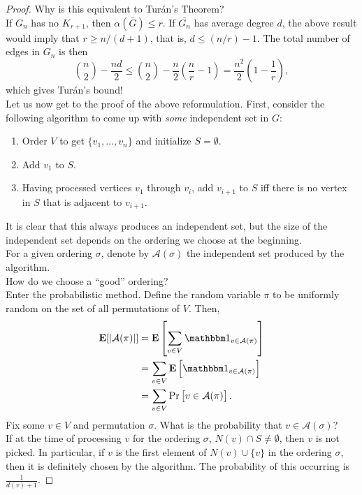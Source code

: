 \documentclass{article}
\begin{document}
		\begin{proof}
			Why is this equivalent to Tur\'{a}n's Theorem?\\
			If $G_n$ has no $K_{r+1}$, then $\alpha(\bar{G}) \le r$. If $\bar{G_n}$ has average degree $d$, the above result would imply that $r \ge n/(d+1)$, that is, $d \le (n/r) - 1$. The total number of edges in $G_n$ is then
			\[ \binom{n}{2} - \frac{nd}{2} \le \binom{n}{2} - \frac{n}{2} \left(\frac{n}{r} - 1\right) = \frac{n^2}{2} \left(1 - \frac{1}{r}\right), \]
			which gives Tur\'{a}n's bound!\\

			Let us now get to the proof of the above reformulation. First, consider the following algorithm to come up with \emph{some} independent set in $G$:
			\begin{enumerate}
				\item Order $V$ to get $\{v_1,\ldots,v_n\}$ and initialize $S = \emptyset$.
				\item Add $v_1$ to $S$.
				\item Having processed vertices $v_1$ through $v_i$, add $v_{i+1}$ to $S$ iff there is no vertex in $S$ that is adjacent to $v_{i+1}$.
			\end{enumerate}
			It is clear that this always produces an independent set, but the size of the independent set depends on the ordering we choose at the beginning.\\
			For a given ordering $\sigma$, denote by $\mathcal{A}(\sigma)$ the independent set produced by the algorithm.\\
			How do we choose a ``good'' ordering?\\
			Enter the probabilistic method. Define the random variable $\pi$ to be uniformly random on the set of all permutations of $V$. Then,
			\begin{align*}
				\expec[ | \mathcal{A}(\pi) | ] &= \expec\left[ \sum_{v \in V} \indic_{v \in \mathcal{A}(\pi)} \right] \\
				&= \sum_{v \in V} \expec\left[ \indic_{v \in \mathcal{A}(\pi)} \right] \\
				&= \sum_{v \in V} \Pr\left[ v \in \mathcal{A}(\pi) \right].
			\end{align*}
			Fix some $v \in V$ and permutation $\sigma$. What is the probability that $v \in \mathcal{A}(\sigma)$?\\
			If at the time of processing $v$ for the ordering $\sigma$, $N(v) \cap S \ne \emptyset$, then $v$ is not picked. In particular, if $v$ is the first element of $N(v) \cup \{v\}$ in the ordering $\sigma$, then it is definitely chosen by the algorithm. The probability of this occurring is $\frac{1}{d(v) + 1}$.

\end{proof}
\end{document}
